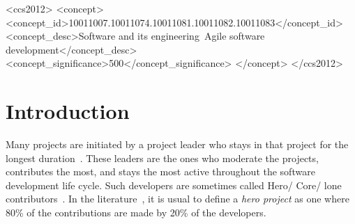 \documentclass[sigconf]{acmart}
\theoremstyle{break}
\begin{document}


\begin{CCSXML}
<ccs2012>
<concept>
<concept_id>10011007.10011074.10011081.10011082.10011083</concept_id>
<concept_desc>Software and its engineering~Agile software 
development</concept_desc>
<concept_significance>500</concept_significance>
</concept>
</ccs2012>
\end{CCSXML}





\maketitle


\section{Introduction}
Many  projects are initiated by a project leader who stays
in that  project for the longest duration~\cite{ye2003toward}. These leaders are the ones who moderate the projects, contributes the most, and stays the most active throughout  the
software development life cycle. Such developers are sometimes called Hero/ Core/ lone contributors~\cite{martinez2014current}.  
In the literature~\cite{goeminne2011evidence,torres2011analysis,robles2009evolution,yamashita2015revisiting},
it is usual to define a {\em hero project} as one where 80\% of the contributions are made by 20\% of the developers.
\end{document}
